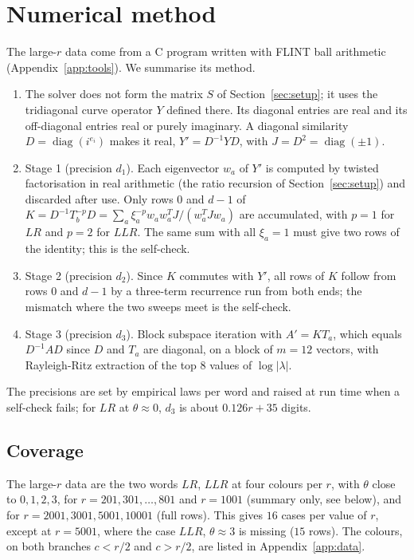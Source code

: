 \documentclass[11pt]{amsart}
\theoremstyle{definition}
\theoremstyle{remark}
\begin{document}
\section{Numerical method}\label{sec:method}

The large-$r$ data come from a C program written with FLINT ball arithmetic
(Appendix~\ref{app:tools}). We summarise its method.

\begin{enumerate}
\item The solver does not form the matrix $S$ of Section~\ref{sec:setup}; it uses the
tridiagonal curve operator $Y$ defined there. Its diagonal entries are real and its
off-diagonal entries real or purely imaginary. A diagonal similarity
$D = \operatorname{diag}(i^{e_i})$ makes it real, $Y' = D^{-1}YD$, with
$J = D^2 = \operatorname{diag}(\pm1)$.
\item Stage 1 (precision $d_1$). Each eigenvector $w_a$ of $Y'$ is computed by
twisted factorisation in real arithmetic (the ratio recursion of
Section~\ref{sec:setup}) and discarded after use. Only rows $0$ and
$d-1$ of $K = D^{-1}T_b^{-p}D = \sum_a \xi_a^{-p} w_a w_a^{T} J/(w_a^T J w_a)$ are
accumulated, with $p = 1$ for $LR$ and $p = 2$ for $LLR$. The same sum with all
$\xi_a = 1$ must give two rows of the identity; this is the self-check.
\item Stage 2 (precision $d_2$). Since $K$ commutes with $Y'$, all rows of $K$ follow
from rows $0$ and $d-1$ by a three-term recurrence run from both ends; the mismatch
where the two sweeps meet is the self-check.
\item Stage 3 (precision $d_3$). Block subspace iteration with $A' = K T_a$, which
equals $D^{-1}AD$ since $D$ and $T_a$ are diagonal, on a block of $m = 12$ vectors,
with Rayleigh-Ritz extraction of the top $8$ values of $\log|\lambda|$.
\end{enumerate}

The precisions are set by empirical laws per word and raised at run time when a
self-check fails; for $LR$ at $\theta \approx 0$, $d_3$ is about $0.126r + 35$
digits.

\subsection*{Coverage}
The large-$r$ data are the two words $LR$, $LLR$ at four colours per $r$, with
$\theta$ close to $0, 1, 2, 3$, for $r = 201, 301, \dots, 801$ and $r = 1001$
(summary only, see below), and for $r = 2001, 3001, 5001, 10001$ (full rows). This
gives $16$ cases per value of $r$, except at $r = 5001$, where the case $LLR$,
$\theta \approx 3$ is missing ($15$ rows). The colours, on both branches
$c < r/2$ and $c > r/2$, are listed in Appendix~\ref{app:data}.
\end{document}
